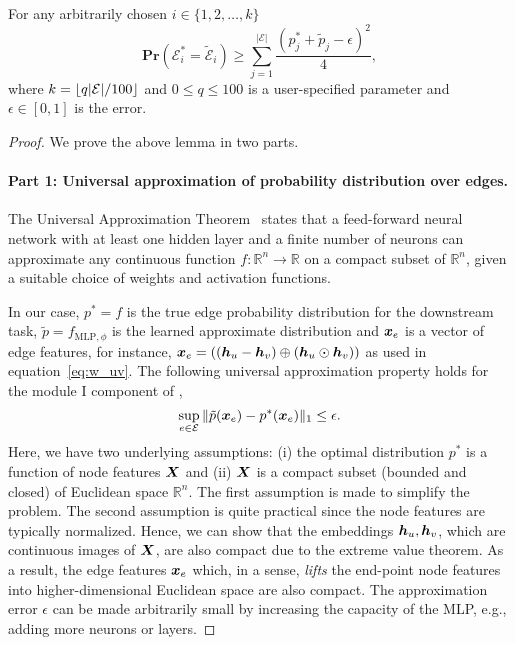 \begin{lemma} 
\label{lem:singleedge}
For any arbitrarily chosen $i \in \{1,2,\ldots, k\}$
\[
\mathbf{Pr}(\mathcal{E}_i^* = \mathcal{\tilde{E}}_i) \geq \sum_{j=1}^{|\mathcal{E}|} \frac{(p^*_j + \tilde{p}_j - \epsilon)^2}{4},
\]
where $k = \lfloor q|\mathcal{E}|/100 \rfloor$ and $0 \leq q \leq 100$ is a user-specified parameter and $\epsilon\in [0,1]$ is the error.
\end{lemma}

\begin{proof} We prove the above lemma in two parts.


\paragraph{Part 1: Universal approximation of probability distribution over edges.}
The Universal Approximation Theorem~\cite{cybenko1989approximation,augustine2024survey} states that a feed-forward neural network with at least one hidden layer and a finite number of neurons can approximate any continuous function $f: \mathbb{R}^n \rightarrow \mathbb{R}$ on a compact subset of $\mathbb{R}^n$, given a suitable choice of weights and activation functions. 

In our case, $p^* = f$ is the true edge probability distribution for the downstream task, $\tilde{p} = f_{\text{MLP},\phi}$ is the learned approximate distribution and ${\bm{x}}_e$ is a vector of edge features, for instance, ${\bm{x}}_e =  (({\bm{h}}_u - {\bm{h}}_v) \oplus ({\bm{h}}_u \odot {\bm{h}}_v))$ as used in equation~\ref{eq:w_uv}. The following universal approximation property holds for the module I component of \sgs,
\begin{equation}
\label{eq:uapp}
\sup_{e \in \mathcal{E}} \|\tilde{p}({\bm{x}}_e) - p^*({\bm{x}}_e)\|_1 \leq \epsilon.
\end{equation}
 Here, we have two underlying assumptions: (i) the optimal distribution $p^*$ is a function of node features ${\bm{X}}$ and (ii) ${\bm{X}}$ is a compact subset (bounded and closed) of Euclidean space $\mathbb{R}^n$. The first assumption is made to simplify the problem. The second assumption is quite practical since the node features are typically normalized. Hence, we can show that the embeddings ${\bm{h}}_u,{\bm{h}}_v$, which are continuous images of ${\bm{X}}$, are also compact due to the extreme value theorem. As a result, the edge features ${\bm{x}}_e$ which, in a sense, \emph{lifts} the end-point node features into higher-dimensional Euclidean space are also compact. The approximation error $\epsilon$ can be made arbitrarily small by increasing the capacity of the MLP, e.g., adding more neurons or layers. 


\end{proof}
